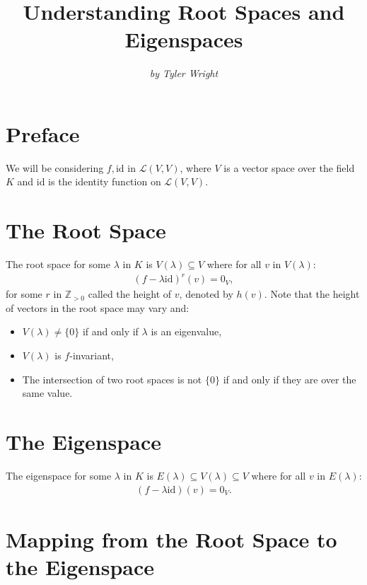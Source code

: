 \documentclass[a4paper, 12pt, twoside]{article}
\begin{document}
\title{Understanding Root Spaces and Eigenspaces}
\date{}
\author{\textit{by Tyler Wright}}
\maketitle

\section{Preface}

We will be considering $f, \text{id}$ in $\mathcal{L}(V, V)$, where $V$ is a 
vector space over the field $K$ and id is the identity function on $\mathcal{L}(V, V)$.

\section{The Root Space}

The root space for some $\lambda$ in $K$ is $V(\lambda) \subseteq V$ where for all 
$v$ in $V(\lambda)$: \begin{gather*}
    (f - \lambda\text{id})^r(v) = 0_{V},
\end{gather*} for some $r$ in $\mathbb{Z}_{> 0}$ called the height of $v$, denoted by $h(v)$.
Note that the height of vectors in the root space may vary and: \begin{itemize}
    \item $V(\lambda) \neq \{0\}$ if and only if $\lambda$ is an eigenvalue,
    \item $V(\lambda)$ is $f$-invariant,
    \item The intersection of two root spaces is not $\{0\}$ if and only if
    they are over the same value.
\end{itemize}

\section{The Eigenspace}

The eigenspace for some $\lambda$ in $K$ is $E(\lambda) \subseteq V(\lambda) \subseteq V$
where for all $v$ in $E(\lambda)$: \begin{gather*}
    (f - \lambda\text{id})(v) = 0_{V}.
\end{gather*}

\newpage

\section{Mapping from the Root Space to the Eigenspace}
\end{document}
